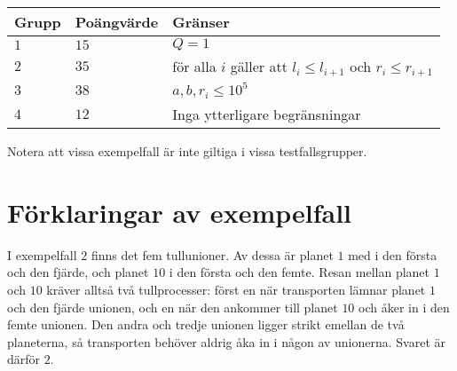 \noindent
\begin{tabular}{| l | l | l |}
  \hline
  Grupp & Poängvärde & Gränser \\ \hline
  $1$   & $15$        & $Q=1$  \\ \hline
  $2$   & $35$        & för alla $i$ gäller att $l_i \le l_{i + 1}$ och $r_i \le r_{i+1}$ \\ \hline
  $3$   & $38$       & $ a,b,r_i \leq 10^5$ \\ \hline
  $4$   & $12$       & Inga ytterligare begränsningar \\ \hline
\end{tabular}

Notera att vissa exempelfall är inte giltiga i vissa testfallsgrupper.

\section*{Förklaringar av exempelfall}
I exempelfall $2$ finns det fem tullunioner.
Av dessa är planet $1$ med i den första och den fjärde, och planet $10$ i den första och den femte.
Resan mellan planet $1$ och $10$ kräver alltså två tullprocesser: först en när transporten lämnar planet $1$ och den fjärde unionen, och en när den ankommer till planet $10$ och åker in i den femte unionen.
Den andra och tredje unionen ligger strikt emellan de två planeterna, så transporten behöver aldrig åka in i någon av unionerna.
Svaret är därför $2$.
